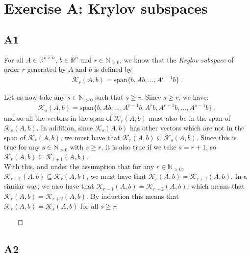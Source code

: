 \documentclass[a4paper,10pt]{article}
\begin{document}
\newpage



\section*{Exercise A: Krylov subspaces}

\subsection*{A1}

For all $A \in \mathbb{R}^{n \times n}$, $b \in \mathbb{R}^n$ and $r \in \mathbb{N}_{>0}$, we know that the \textit{Krylov subspace} of order $r$ generated by $A$ and $b$ is defined by 
\begin{align*}
    \mathcal{K}_r(A,b) = \text{span}\{b,Ab,\dots,A^{r-1}b\} \; .
\end{align*}

Let us now take any $s \in \mathbb{N}_{>0}$ such that $s \geq r$. Since $s \geq r$, we have:
\begin{align*}
    \mathcal{K}_s(A,b) = \text{span}\{b,Ab,\dots,A^{r-1}b,A^rb,A^{r+1}b,\dots,A^{s-1}b\} \; ,
\end{align*}
and so all the vectors in the span of $\mathcal{K}_r(A,b)$ must also be in the span of $\mathcal{K}_s(A,b)$. In addition, since $\mathcal{K}_s(A,b)$ has other vectors which are not in the span of $\mathcal{K}_r(A,b)$, we must have that $\mathcal{K}_r(A,b) \subseteq \mathcal{K}_s(A,b)$. Since this is true for any $s \in \mathbb{N}_{>0}$ with $s \geq r$, it is also true if we take $s = r+1$, so $\mathcal{K}_r(A,b) \subseteq \mathcal{K}_{r+1}(A,b)$. \\

With this, and under the assumption that for any $r \in \mathbb{N}_{>0}$, $\mathcal{K}_{r+1}(A,b) \subseteq \mathcal{K}_r(A,b)$, we must have that $\mathcal{K}_r(A,b) = \mathcal{K}_{r+1}(A,b)$. In a similar way, we also have that $\mathcal{K}_{r+1}(A,b) = \mathcal{K}_{r+2}(A,b)$, which means that $\mathcal{K}_r(A,b) = \mathcal{K}_{r+2}(A,b)$. By induction this means that $\mathcal{K}_r(A,b) = \mathcal{K}_s(A,b)$ for all $s \geq r$. \\
\begin{flushright}
    $\qed$
\end{flushright}


\subsection*{A2}
\end{document}
